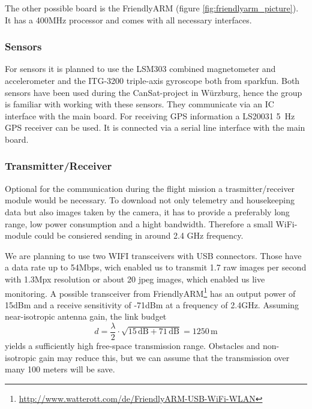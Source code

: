 \documentclass[fontsize=11pt,paper=a4,]{scrartcl}
\newcommand{\unit}[1]{\ensuremath{\,\mathrm{#1}}}
\begin{document}
The other possible board is the FriendlyARM (figure \ref{fig:friendlyarm_picture}).
It has a 400MHz processor and comes with all necessary interfaces.


\subsubsection*{Sensors}

For sensors it is planned to use the LSM303 \cite{LSM303:datasheet} combined magnetometer and accelerometer and the ITG-3200 triple-axis gyroscope \cite{ITG-3200:datasheet} both from sparkfun. Both sensors have been used during the CanSat-project in Würzburg, hence the group is familiar with working with these sensors. They communicate via an I{\texttwosuperior}C interface with the main board. For receiving GPS information a LS20031 5~Hz GPS receiver \cite{LS20031:datasheet} can be used. It is connected via a serial line interface with the main board.


\subsubsection*{Transmitter/Receiver}

Optional for the communication during the flight mission a trasmitter/receiver module would be necessary. To download not only telemetry and housekeeping data but also images taken by the camera, it has to provide a preferably long range, low power consumption and a hight bandwidth. Therefore a small WiFi-module could be consiered sending in around 2.4 GHz frequency.

We are planning to use two WIFI transceivers with USB connectors.
Those have a data rate up to 54Mbps, wich enabled us to transmit 1.7 raw images per second with 1.3Mpx re\-so\-lu\-tion or about 20 jpeg images, which enabled us live monitoring.
A possible transceiver from FriendlyARM\footnote{\url{http://www.watterott.com/de/FriendlyARM-USB-WiFi-WLAN}} has an output power of 15dBm and a receive sensitivity of -71dBm at a frequency of 2.4GHz.
Assuming near-isotropic antenna gain, the link budget
\begin{equation}
d = \frac{\lambda}{2}\cdot\sqrt{15\unit{dB}+71\unit{dB}} = 1250\unit{m}
\end{equation}
yields a sufficiently high free-space transmission range.
Obstacles and non-isotropic gain may reduce this, but we can assume that the transmission over many 100 meters will be save.
\end{document}
